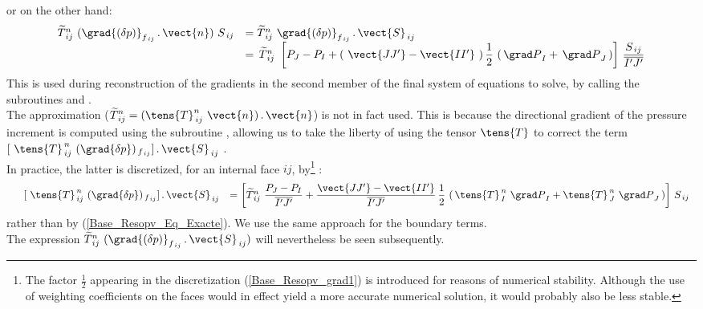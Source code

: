 or on the other hand:
\begin{equation}
\begin{array} {lll}\label{Base_Resopv_Eq_Exacte}
\widetilde{T}^n_{\,ij} \ ({\grad{(\delta p)}}_{f_{\,ij}}\,.\,\vect{n}) \ S_{\,ij} &= \widetilde{T}^n_{\,ij} \ {\grad{(\delta p)}}_{f_{\,ij}}\,.\,\vect{S}_{\,ij}\\
&=\,\widetilde{T}^n_{\,ij}\ \left[ P_J - P_I
 + (\ \vect{JJ'} - \vect{II'}\ )\,\displaystyle \frac{1}{2}\ (\,{\grad P}_I + \,{\grad P}_J\,)\right]\, \displaystyle \frac{S_{\,ij}}{\overline{I'J'}}
\end{array}
\end{equation}
This is used during reconstruction of the gradients in the second member of the final system of equations to solve, by calling the subroutines  and .\\
The approximation ($\displaystyle \widetilde{T}^n_{\,ij}=(\tens{T}^n_{\,ij}\ \vect{n})\,.\,\vect{n}$) is not in fact used. This is because the directional gradient of the pressure increment is computed using the subroutine , allowing us to take the liberty of using the tensor $\tens{T}$ to correct the term $[\ \tens{T}^{\,n}_{\,ij}\ (\grad{\delta p})_{\,f_{\,ij}}]\,.\,\vect{S}_{\,ij}$ .\\
In practice, the latter is discretized, for an internal face $ij$, by\footnote{The factor $\displaystyle \frac{1}{2}$ appearing in the discretization (\ref{Base_Resopv_grad1}) is introduced for reasons of numerical stability. Although the use of weighting coefficients on the faces would in effect yield a more accurate numerical solution, it would probably also be less stable.}
:
\begin{equation}\label{Base_Resopv_grad1}
\begin{array} {lll}
&[\ \tens{T}^{\,n}_{\,ij}\ (\grad{\delta p})_{\,f_{\,ij}}]\,.\,\vect{S}_{\,ij}
&=\left[\widetilde{T}^n_{\,ij}\ \displaystyle \frac{P_J - P_I}{\overline{I'J'}} + \displaystyle
 \frac{\vect{JJ'} -\vect{II'}}{\overline{I'J'}} \, \frac{1}{2}\ (\,\tens{T}^{\,n}_{\,I}\ {\grad P}_I + \tens{T}^{\,n}_{\,J}\ {\grad P}_J\,)\right]\,S_{\,ij}
\end{array}
\end{equation}
rather than by (\ref{Base_Resopv_Eq_Exacte}).
We use the same approach for the boundary terms.\\
The expression $\widetilde{T}^n_{\,ij} \ ({\grad{(\delta p)}}_{f_{\,ij}}\,.\,\vect{S}_{\,ij})$ will nevertheless be seen subsequently.\\
